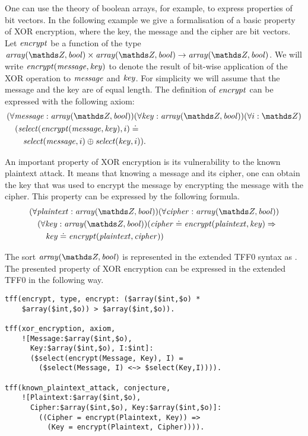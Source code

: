 One can use the theory of boolean arrays, for example, to express properties of bit vectors. In the following example we give a formalisation of a basic property of XOR encryption, where the key, the message and the cipher are bit vectors. Let $\mathit{encrypt}$ be a function of the type $\arrayt(\Z,\bool) \times \arrayt(\Z,\bool) \to \arrayt(\Z,\bool)$. We will write $\mathit{encrypt}(\mathit{message}, \mathit{key})$ to denote the result of bit-wise application of the XOR operation to $\mathit{message}$ and $\mathit{key}$. For simplicity we will assume that the message and the key are of equal length. The definition of $\mathit{encrypt}$ can be expressed with the following axiom:
\begin{align*}
  &(\forall \msg:\arrayt(\Z,\bool))(\forall \key:\arrayt(\Z,\bool))(\forall i:\Z)\\
  &\quad(\select{\encrypt(\msg,\key)}{i} \eql \\
  &\quad\quad\select{\msg}{i} \oplus \select{\key}{i}).
\end{align*}

An important property of XOR encryption is its vulnerability to the known plaintext attack. It means that knowing a message and its cipher, one can obtain the key that was used to encrypt the message by encrypting the message with the cipher. This property can be expressed by the following formula.
\begin{align*}
  &(\forall \plaintext:\arrayt(\Z,\bool))(\forall \cipher:\arrayt(\Z,\bool))\\
  &\quad(\forall \key:\arrayt(\Z,\bool))(\cipher \eql \encrypt(\plaintext,\key) \implies\\
  &\quad\quad\key \eql \encrypt(\plaintext,\cipher))
\end{align*}

The sort $\arrayt(\Z,\bool)$ is represented in the extended TFF0 syntax as \darray{\dint}{\dbool}. The presented property of XOR encryption can be expressed in the extended TFF0 in the following way.
\begin{lstlisting}[language=tptp]
tff(encrypt, type, encrypt: ($array($int,$o) *
    $array($int,$o)) > $array($int,$o)).

tff(xor_encryption, axiom,
    ![Message:$array($int,$o),
      Key:$array($int,$o), I:$int]:
      ($select(encrypt(Message, Key), I) =
        ($select(Message, I) <~> $select(Key,I)))).

tff(known_plaintext_attack, conjecture,
    ![Plaintext:$array($int,$o),
      Cipher:$array($int,$o), Key:$array($int,$o)]:
        ((Cipher = encrypt(Plaintext, Key)) =>
          (Key = encrypt(Plaintext, Cipher)))).
\end{lstlisting}
